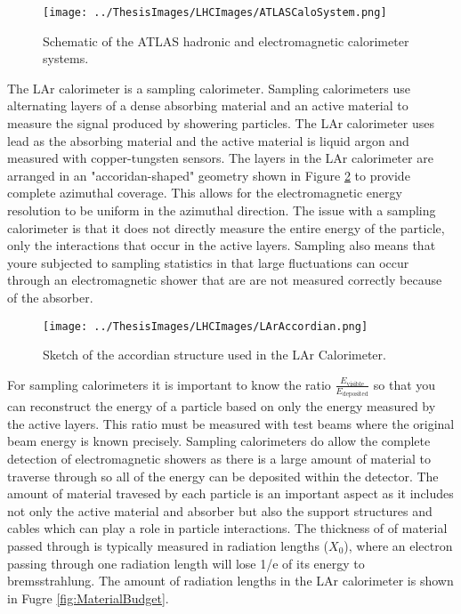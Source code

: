 \begin{figure}[h!]
	\centering
	\texttt{[image: ../ThesisImages/LHCImages/ATLASCaloSystem.png]}
	\caption[Schematic of the ATLAS hadronic and electromagnetic calorimeter systems.]{Schematic of the ATLAS hadronic and electromagnetic calorimeter systems.\cite{ATLAS}
	}
	\label{fig:ATLASCaloSys}
\end{figure}

The LAr calorimeter is a sampling calorimeter.  Sampling calorimeters use alternating layers of a dense absorbing material and an active material to measure the signal produced by showering particles.  The LAr calorimeter uses lead as the absorbing material and the active material is liquid argon and measured with copper-tungsten sensors.  The layers in the LAr calorimeter are arranged in an "accoridan-shaped" geometry shown in Figure \ref{fig:LArAccordian} to provide complete azimuthal coverage.  This allows for the electromagnetic energy resolution to be uniform in the azimuthal direction.  The issue with a sampling calorimeter is that it does not directly measure the entire energy of the particle, only the interactions that occur in the active layers.  Sampling also means that youre subjected to sampling statistics in that large fluctuations can occur through an electromagnetic shower that are are not measured correctly because of the absorber.  
\begin{figure}[h!]
	\centering
	\texttt{[image: ../ThesisImages/LHCImages/LArAccordian.png]}
	\caption[Sketch of the accordian structure used in the LAr Calorimeter]{Sketch of the accordian structure used in the LAr Calorimeter.\cite{CERN-LHCC-96-041}
	}
	\label{fig:LArAccordian}
\end{figure}

For sampling calorimeters it is important to know the ratio $\frac{E_{\text{visible}}}{E_{\text{deposited}}}$ so that you can reconstruct the energy of a particle based on only the energy measured by the active layers.  This ratio must be measured with test beams where the original beam energy is known precisely.  Sampling calorimeters do allow the complete detection of electromagnetic showers as there is a large amount of material to traverse through so all of the energy can be deposited within the detector. The amount of material travesed by each particle is an important aspect as it includes not only the active material and absorber but also the support structures and cables which can play a role in particle interactions.  The thickness of of material passed through is typically measured in radiation lengths ($X_0$), where an electron passing through one radiation length will lose 1/e of its energy to bremsstrahlung.  The amount of radiation lengths in the LAr calorimeter is shown in Fugre \ref{fig:MaterialBudget}.  

